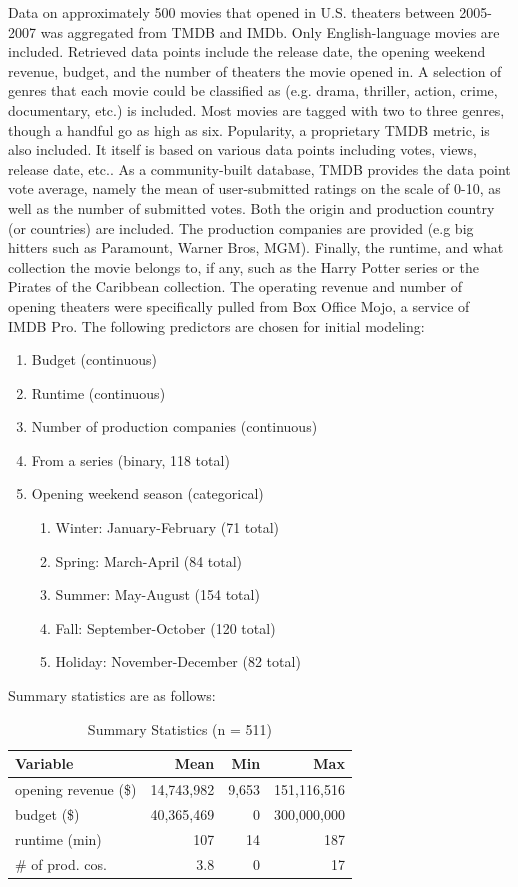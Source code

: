 \documentclass[10pt]{article}
\begin{document}
Data on approximately 500 movies that opened in U.S. theaters between 2005-2007 was aggregated from TMDB and IMDb. Only English-language movies are included. Retrieved data points include the release date, the opening weekend revenue, budget, and the number of theaters the movie opened in. A selection of genres that each movie could be classified as (e.g. drama, thriller, action, crime, documentary, etc.) is included. Most movies are tagged with two to three genres, though a handful go as high as six. Popularity, a proprietary TMDB metric, is also included. It itself is based on various data points including votes, views, release date, etc.. As a community-built database, TMDB provides the data point vote average, namely the mean of user-submitted ratings on the scale of 0-10, as well as the number of submitted votes.  Both the origin and production country (or countries) are included. The production companies are provided (e.g big hitters such as Paramount, Warner Bros, MGM). Finally, the runtime, and what collection the movie belongs to, if any, such as the Harry Potter series or the Pirates of the Caribbean collection. The operating revenue and number of opening theaters were specifically pulled from Box Office Mojo, a service of IMDB Pro. The following predictors are chosen for initial modeling:
\begin{enumerate}
\item Budget (continuous)
\item Runtime (continuous)
\item Number of production companies (continuous)
\item From a series (binary, 118 total)
\item Opening weekend season (categorical)
\begin{enumerate}
\item Winter: January-February (71 total)
\item Spring: March-April (84 total)
\item Summer: May-August (154 total)
\item Fall: September-October (120 total)
\item Holiday: November-December (82 total)
\end{enumerate}
\end{enumerate}

Summary statistics are as follows:
\begin{table}[H]
\centering
\caption{Summary Statistics (n = 511)}
\begin{tabular}{lrrr} 
\toprule
Variable & Mean & Min & Max \\ 
\midrule
opening revenue (\$) & 14,743,982 & 9,653 & 151,116,516\\
budget (\$) & 40,365,469 & 0 & 300,000,000\\
runtime (min) & 107 & 14 & 187\\
\# of prod. cos. & 3.8 & 0 & 17\\
\bottomrule
\end{tabular}  
\end{table}
\end{document}
